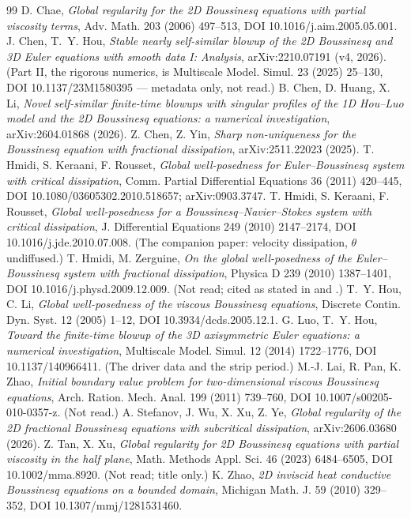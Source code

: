\documentclass[11pt,a4paper]{article}
\begin{document}
\begin{thebibliography}{99}
 D. Chae, \emph{Global regularity for the 2D Boussinesq equations with partial viscosity terms}, Adv. Math. 203 (2006) 497--513, DOI 10.1016/j.aim.2005.05.001.
 J. Chen, T.~Y. Hou, \emph{Stable nearly self-similar blowup of the 2D Boussinesq and 3D Euler equations with smooth data I: Analysis}, arXiv:2210.07191 (v4, 2026). (Part II, the rigorous numerics, is Multiscale Model. Simul. 23 (2025) 25--130, DOI 10.1137/23M1580395 --- metadata only, not read.)
 B. Chen, D. Huang, X. Li, \emph{Novel self-similar finite-time blowups with singular profiles of the 1D Hou--Luo model and the 2D Boussinesq equations: a numerical investigation}, arXiv:2604.01868 (2026).
 Z. Chen, Z. Yin, \emph{Sharp non-uniqueness for the Boussinesq equation with fractional dissipation}, arXiv:2511.22023 (2025).
 T. Hmidi, S. Keraani, F. Rousset, \emph{Global well-posedness for Euler--Boussinesq system with critical dissipation}, Comm. Partial Differential Equations 36 (2011) 420--445, DOI 10.1080/03605302.2010.518657; arXiv:0903.3747.
 T. Hmidi, S. Keraani, F. Rousset, \emph{Global well-posedness for a Boussinesq--Navier--Stokes system with critical dissipation}, J. Differential Equations 249 (2010) 2147--2174, DOI 10.1016/j.jde.2010.07.008. (The companion paper: velocity dissipation, $\theta$ undiffused.)
 T. Hmidi, M. Zerguine, \emph{On the global well-posedness of the Euler--Boussinesq system with fractional dissipation}, Physica D 239 (2010) 1387--1401, DOI 10.1016/j.physd.2009.12.009. (Not read; cited as stated in \cite[\S1]{HKR11} and \cite[\S1]{SWXY26}.)
 T.~Y. Hou, C. Li, \emph{Global well-posedness of the viscous Boussinesq equations}, Discrete Contin. Dyn. Syst. 12 (2005) 1--12, DOI 10.3934/dcds.2005.12.1.
 G. Luo, T.~Y. Hou, \emph{Toward the finite-time blowup of the 3D axisymmetric Euler equations: a numerical investigation}, Multiscale Model. Simul. 12 (2014) 1722--1776, DOI 10.1137/140966411. (The driver data and the strip period.)
 M.-J. Lai, R. Pan, K. Zhao, \emph{Initial boundary value problem for two-dimensional viscous Boussinesq equations}, Arch. Ration. Mech. Anal. 199 (2011) 739--760, DOI 10.1007/s00205-010-0357-z. (Not read.)
 A. Stefanov, J. Wu, X. Xu, Z. Ye, \emph{Global regularity of the 2D fractional Boussinesq equations with subcritical dissipation}, arXiv:2606.03680 (2026).
 Z. Tan, X. Xu, \emph{Global regularity for 2D Boussinesq equations with partial viscosity in the half plane}, Math. Methods Appl. Sci. 46 (2023) 6484--6505, DOI 10.1002/mma.8920. (Not read; title only.)
 K. Zhao, \emph{2D inviscid heat conductive Boussinesq equations on a bounded domain}, Michigan Math. J. 59 (2010) 329--352, DOI 10.1307/mmj/1281531460.
\end{thebibliography}
\end{document}
